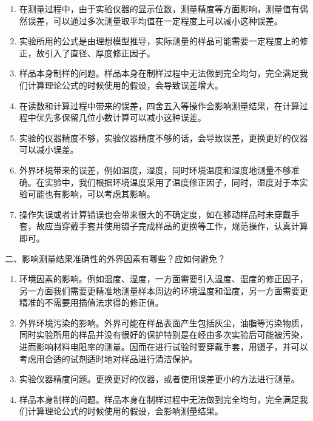 \documentclass[a4paper,utf8]{article}
\begin{document}
\begin{enumerate}
    \item 在测量过程中，由于实验仪器的显示位数，测量精度等方面影响，测量值有偶然误差，可以通过多次测量取平均值在一定程度上可以减小这种误差。
    \item 实验所用的公式是由理想模型推导，实际测量的样品可能需要一定程度上的修正，故引入了直径、厚度修正因子。
    \item 样品本身制样的问题。样品本身在制样过程中无法做到完全均匀，完全满足我们计算理论公式的时候使用的假设，会导致误差增大。
    \item 在读数和计算过程中带来的误差，四舍五入等操作会影响测量结果，在计算过程中优先多保留几位小数计算可以减小这种误差。
    \item 实验的仪器精度不够，实验仪器精度不够的话，会导致误差，更换更好的仪器可以减小误差。
    \item 外界环境带来的误差，例如温度，湿度，同时环境温度和湿度地测量不够准确。在实验中，我们根据环境温度采用了温度修正因子，同时，湿度对于本实验可能也有影响，可以考虑其影响。
    \item 操作失误或者计算错误也会带来很大的不确定度，如在移动样品时未穿戴手套，故应当穿戴手套并使用镊子完成样品的更换等工作，规范操作，认真计算即可。

\end{enumerate}

\begin{center}
    二、影响测量结果准确性的外界因素有哪些？应如何避免？
\end{center}

\begin{enumerate}
    \item 环境因素的影响。例如温度、湿度，一方面需要引入温度、湿度的修正因子，另一方面我们需要更精准地测量样本周边的环境温度和湿度，另一方面需要更精准的不需要用插值法求得的修正值。
    \item 外界环境污染的影响。外界可能在样品表面产生包括灰尘，油脂等污染物质，同时实验所用的样品并没有很好的保护特别是在经由多次实验后可能被污染，进而影响材料电阻率的测量。因而在进行试验时要穿戴手套，用镊子，并可以考虑用合适的试剂适时地对样品进行清洁保护。
    \item 实验仪器精度问题。更换更好的仪器，或者使用误差更小的方法进行测量。
    \item 样品本身制样的问题。样品本身在制样过程中无法做到完全均匀，完全满足我们计算理论公式的时候使用的假设，会影响测量结果。
\end{enumerate}
\end{document}
